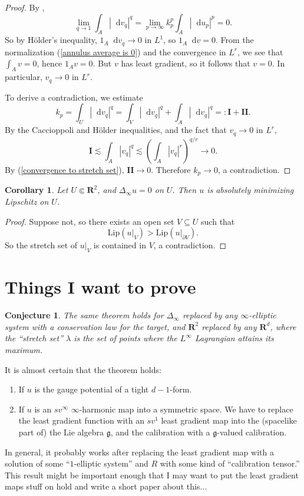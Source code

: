 \documentclass[reqno,11pt]{amsart}
\newcommand{\RR}{\mathbf{R}}
\newcommand*\dif{\mathop{}\!\mathrm{d}}
\newcommand{\Lip}{\mathrm{Lip}}
\newtheorem{corollary}[theorem]{Corollary}
\newtheorem{conjecture}[theorem]{Conjecture}
\theoremstyle{definition}
\numberwithin{equation}{section}
\begin{document}
\begin{proof}
By \cite[Proposition 6.5]{daskalopoulos2022transverse},
\begin{equation}\label{convergence to stretch set}
\lim_{q \to 1} \int_A |\dif v_q|^q = \lim_{p \to \infty} k_p^p \int_A |\dif u_p|^p = 0.
\end{equation}
So by H\"older's inequality, $1_A \dif v_q \to 0$ in $L^1$, so $1_A \dif v = 0$.
From the normalization (\ref{annulus average is 0}) and the convergence in $L^r$, we see that $\int_A v = 0$, hence $1_A v = 0$.
But $v$ has least gradient, so it follows that $v = 0$.
In particular, $v_q \to 0$ in $L^r$.

To derive a contradiction, we estimate
$$k_p = \int_U |\dif v_q|^q = \int_V |\dif v_q|^q + \int_A |\dif v_q|^q =: \mathbf{I} + \mathbf{II}.$$
By the Caccioppoli and H\"older inequalities, and the fact that $v_q \to 0$ in $L^r$,
$$\mathbf{I} \lesssim \int_A |v_q|^q \lesssim \left(\int_A |v_q|^r\right)^{q/r} \to 0.$$
By (\ref{convergence to stretch set}), $\mathbf{II} \to 0$.
Therefore $k_p \to 0$, a contradiction.
\end{proof}

\begin{corollary}
Let $U \Subset \RR^2$, and $\Delta_\infty u = 0$ on $U$.
Then $u$ is absolutely minimizing Lipschitz on $U$.
\end{corollary}
\begin{proof}
Suppose not, so there exists an open set $V \subseteq U$ such that 
$$\Lip(u|_V) > \Lip(u|_{\partial V}).$$
So the stretch set of $u|_V$ is contained in $V$, a contradiction.
\end{proof}

\section{Things I want to prove}
\begin{conjecture}
The same theorem holds for $\Delta_\infty$ replaced by any $\infty$-elliptic system with a conservation law for the target, and $\RR^2$ replaced by any $\RR^d$, where the ``stretch set'' $\lambda$ is the set of points where the $L^\infty$ Lagrangian attains its maximum.
\end{conjecture}

It is almost certain that the theorem holds:
\begin{enumerate}
\item If $u$ is the gauge potential of a tight $d - 1$-form.
\item If $u$ is an $sv^\infty$ $\infty$-harmonic map into a symmetric space. We have to replace the least gradient function with an $sv^1$ least gradient map into the (spacelike part of) the Lie algebra $\mathfrak g$, and the calibration with a $\mathfrak g$-valued calibration.
\end{enumerate}
In general, it probably works after replacing the least gradient map with a solution of some ``$1$-elliptic system'' and $R$ with some kind of ``calibration tensor.''
This result might be important enough that I may want to put the least gradient maps stuff on hold and write a short paper about this...

\printbibliography
\end{document}
